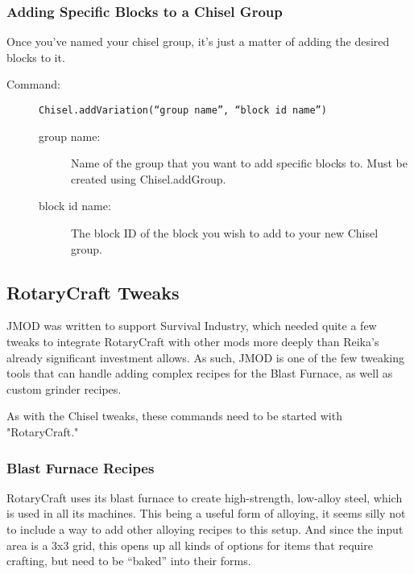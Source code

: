 \documentclass[letterpaper,titlepage,12pt]{article}
\begin{document}
\subsubsection{Adding Specific Blocks to a Chisel Group}

Once you've named your chisel group, it's just a matter of adding the desired blocks to it.

\begin{description}
\item[Command:] \texttt{Chisel.addVariation(``group name'', ``block id name'')}
\begin{description}
\item [group name:] Name of the group that you want to add specific blocks to.  Must be created using Chisel.addGroup.
\item [block id name:] The block ID of the block you wish to add to your new Chisel group.
\end{description}
\end{description}

\subsection{RotaryCraft Tweaks}

JMOD was written to support Survival Industry, which needed quite a few tweaks to integrate RotaryCraft with other mods more deeply than Reika's already significant investment allows.  As such, JMOD is one of the few tweaking tools that can handle adding complex recipes for the Blast Furnace, as well as custom grinder recipes.

As with the Chisel tweaks, these commands need to be started with "RotaryCraft."

\subsubsection{Blast Furnace Recipes}

RotaryCraft uses its blast furnace to create high-strength, low-alloy steel, which is used in all its machines.  This being a useful form of alloying, it seems silly not to include a way to add other alloying recipes to this setup.  And since the input area is a 3x3 grid, this opens up all kinds of options for items that require crafting, but need to be ``baked'' into their forms.
\end{document}
